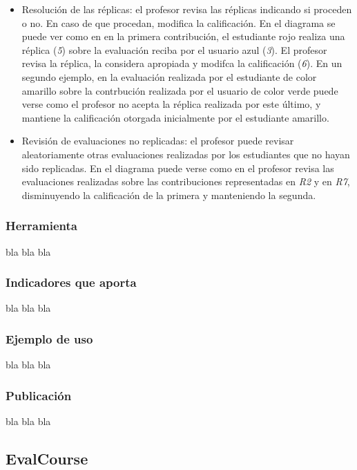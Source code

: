\begin{itemize}
\item Resolución de las réplicas: el profesor revisa las réplicas indicando si proceden o no. En caso de que procedan, modifica la calificación. En el diagrama se puede ver como en en la primera contribución, el estudiante rojo realiza una réplica (\emph{5}) sobre la evaluación reciba por el usuario azul (\emph{3}). El profesor revisa la réplica, la considera apropiada y modifca la calificación (\emph{6}). En un segundo ejemplo, en la evaluación realizada por el estudiante de color amarillo sobre la contrbución realizada por el usuario de color verde puede verse como el profesor no acepta la réplica realizada por este último, y mantiene la calificación otorgada inicialmente por el estudiante amarillo.
\item Revisión de evaluaciones no replicadas: el profesor puede revisar aleatoriamente otras evaluaciones realizadas por los estudiantes que no hayan sido replicadas. En el diagrama puede verse como en el profesor revisa las evaluaciones realizadas sobre las contribuciones representadas en \emph{R2} y en \emph{R7}, disminuyendo la calificación de la primera y manteniendo la segunda.
\end{itemize}

\subsubsection{Herramienta}

bla bla bla

\subsubsection{Indicadores que aporta}

bla bla bla

\subsubsection{Ejemplo de uso}

bla bla bla

\subsubsection{Publicación}

bla bla bla

\subsection{EvalCourse}

